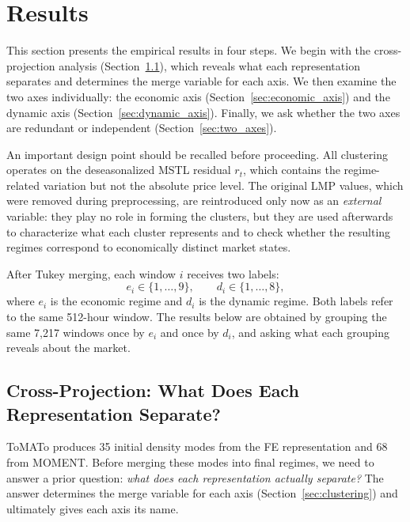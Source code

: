 \documentclass[12pt]{article}
\begin{document}
\section{Results}
\label{sec:results}

This section presents the empirical results in four steps.
We begin with the cross-projection analysis (Section~\ref{sec:cross_projection}), which reveals what each representation separates and determines the merge variable for each axis.
We then examine the two axes individually: the economic axis (Section~\ref{sec:economic_axis}) and the dynamic axis (Section~\ref{sec:dynamic_axis}).
Finally, we ask whether the two axes are redundant or independent (Section~\ref{sec:two_axes}).

An important design point should be recalled before proceeding.
All clustering operates on the deseasonalized MSTL residual $r_t$, which contains the regime-related variation but not the absolute price level.
The original LMP values, which were removed during preprocessing, are reintroduced only now as an \emph{external} variable: they play no role in forming the clusters, but they are used afterwards to characterize what each cluster represents and to check whether the resulting regimes correspond to economically distinct market states.

After Tukey merging, each window $i$ receives two labels:
\begin{equation}
e_i \in \{1,\ldots,9\},
\qquad
d_i \in \{1,\ldots,8\},
\label{eq:final_labels}
\end{equation}
where $e_i$ is the economic regime and $d_i$ is the dynamic regime.
Both labels refer to the same 512-hour window.
The results below are obtained by grouping the same 7,217 windows once by $e_i$ and once by $d_i$, and asking what each grouping reveals about the market.

\subsection{Cross-Projection: What Does Each Representation Separate?}
\label{sec:cross_projection}

ToMATo produces 35 initial density modes from the FE representation and 68 from MOMENT.
Before merging these modes into final regimes, we need to answer a prior question: \emph{what does each representation actually separate?}
The answer determines the merge variable for each axis (Section~\ref{sec:clustering}) and ultimately gives each axis its name.
\end{document}

